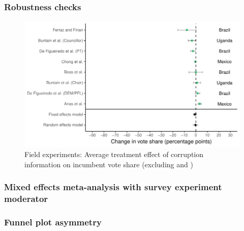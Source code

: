 \documentclass[usenames,dvipsnames]{beamer}
\begin{document}

\begin{frame}[label=supplemental, noframenumbering]
\frametitle{Robustness checks}

\begin{figure}[!hb]
\hspace*{-11mm}
\includegraphics[scale = 0.75]{../figs/field_no_banerjee.pdf}
\vspace{-0.2cm}
\caption{Field experiments: Average treatment effect of corruption information on incumbent vote share (excluding \cite{banerjee2010can} and \citet{banerjee2011informed})}
\small
\vspace{-0.5cm}
\label{fig: field_no_banerjee}
\end{figure}
\end{frame}


\begin{frame}[label = me_mod, noframenumbering]
\frametitle{Mixed effects meta-analysis with survey experiment moderator \hyperlink{heterogeneity}{}}



\end{frame}


\begin{frame}[label=funnel, noframenumbering]
\frametitle{Funnel plot asymmetry \hyperlink{pub_bias}{}}



\end{frame}

\end{document}
